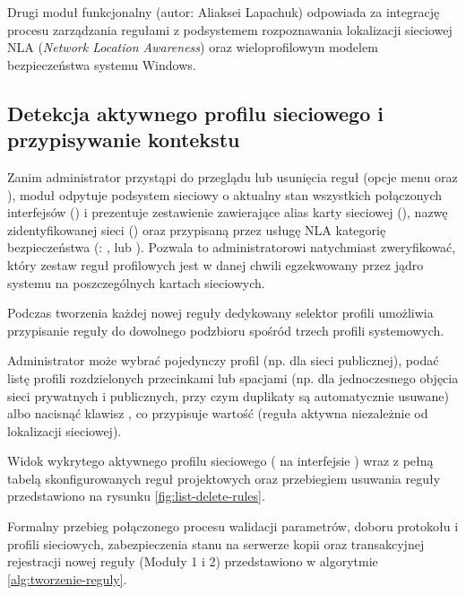 Drugi moduł funkcjonalny (autor: Aliaksei Lapachuk) odpowiada za integrację procesu zarządzania regułami z podsystemem rozpoznawania lokalizacji sieciowej NLA (\textit{Network Location Awareness}) oraz wieloprofilowym modelem bezpieczeństwa systemu Windows.

\subsection{Detekcja aktywnego profilu sieciowego i przypisywanie kontekstu}\label{subsec:detekcja-profilu}

Zanim administrator przystąpi do przeglądu lub usunięcia reguł (opcje menu  oraz ), moduł odpytuje podsystem sieciowy o aktualny stan wszystkich połączonych interfejsów () i prezentuje zestawienie zawierające alias karty sieciowej (), nazwę zidentyfikowanej sieci () oraz przypisaną przez usługę NLA kategorię bezpieczeństwa (: ,  lub ). Pozwala to administratorowi natychmiast zweryfikować, który zestaw reguł profilowych jest w danej chwili egzekwowany przez jądro systemu na poszczególnych kartach sieciowych.

Podczas tworzenia każdej nowej reguły dedykowany selektor profili umożliwia przypisanie reguły do dowolnego podzbioru spośród trzech profili systemowych.

Administrator może wybrać pojedynczy profil (np.  dla sieci publicznej), podać listę profili rozdzielonych przecinkami lub spacjami (np.  dla jednoczesnego objęcia sieci prywatnych i publicznych, przy czym duplikaty są automatycznie usuwane) albo nacisnąć klawisz , co przypisuje wartość  (reguła aktywna niezależnie od lokalizacji sieciowej).

Widok wykrytego aktywnego profilu sieciowego ( na interfejsie ) wraz z pełną tabelą skonfigurowanych reguł projektowych oraz przebiegiem usuwania reguły przedstawiono na rysunku \ref{fig:list-delete-rules}.


Formalny przebieg połączonego procesu walidacji parametrów, doboru protokołu i profili sieciowych, zabezpieczenia stanu na serwerze kopii oraz transakcyjnej rejestracji nowej reguły (Moduły 1 i 2) przedstawiono w algorytmie \ref{alg:tworzenie-reguly}.

